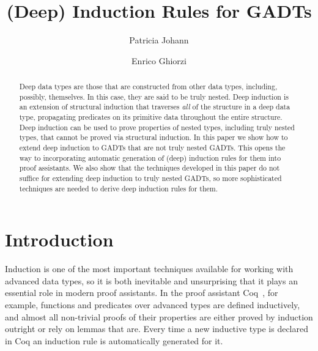 \documentclass[sigplan,10pt]{acmart}
\begin{document}
\title[(Deep) Induction Rules for GADTs]{(Deep) Induction Rules for GADTs}
  \author{Patricia Johann}
  \author{Enrico Ghiorzi}

\begin{abstract} 
  Deep data types are those that are constructed from other data types,
  including, possibly, themselves.  In this case, they are said to be
  truly nested.  Deep induction is an extension of structural
  induction that traverses {\em all} of the structure in a deep data
  type, propagating predicates on its primitive data throughout the
  entire structure.  Deep induction can be used to prove properties of
  nested types, including truly nested types, that cannot be proved
  via structural induction.  In this paper we show how to extend deep
  induction to GADTs that are not truly nested GADTs.  This opens the
  way to incorporating automatic generation of (deep) induction rules
  for them into proof assistants.  We also show that the techniques
  developed in this paper do not suffice for extending deep induction
  to truly nested GADTs, so more sophisticated techniques are needed
  to derive deep induction rules for them.
\end{abstract}

\maketitle

\vspace*{-0.1in}

\section{Introduction}\label{sec:intro}

Induction is one of the most important techniques available for
working with advanced data types, so it is both inevitable and
unsurprising that it plays an essential role in modern proof
assistants. In the proof assistant Coq~\cite{coq20}, for example,
functions and predicates over advanced types are defined inductively,
and almost all non-trivial proofs of their properties are either
proved by induction outright or rely on lemmas that are.  Every time a
new inductive type is declared in Coq an induction rule is
automatically generated for it.
\end{document}
